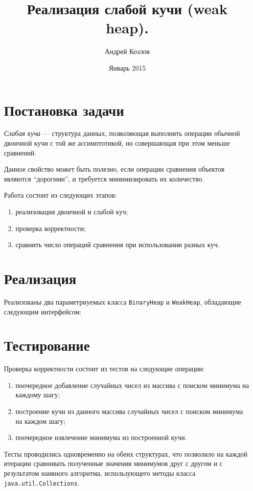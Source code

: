 \documentclass[12pt,a4paper]{article}
\begin{document}
\title{Реализация слабой кучи (weak heap).}
\author{Андрей Козлов}
\date{Январь 2015}

\maketitle

\section*{Постановка задачи}
\textit{Слабая куча} --- структура данных, позволяющая выполнять операции обычной двоичной кучи с той же ассимптотикой, но совершающая при этом меньше сравнений.

Данное свойство может быть полезно, если операции сравнения объектов являются ``дорогими'', и требуется минимизировать их количество.

Работа состоит из следующих этапов:
\begin{enumerate}
	\item реализовация двоичной и слабой куч;
	\item проверка корректности;
	\item сравнить число операций сравнения при использовании разных куч.
\end{enumerate}

\section*{Реализация}
Реализованы два параметриуемых класса \texttt{BinaryHeap} и \texttt{WeakHeap}, обладающие следующим интерфейсом:


\section*{Тестирование}
Проверка корректности состоит из тестов на следующие операции:
\begin{enumerate}
	\item поочередное добавление случайных чисел из массива с поиском минимума на каждому шагу;
	\item построение кучи из данного массива случайных чисел с поиском минимума на каждом шагу;
	\item поочередное извлечение минимума из построенной кучи.
\end{enumerate}

Тесты проводились одновременно на обеих структурах, что позволило на каждой итерации сравнивать полученные значения минимумов друг с другом и с результатом наивного алгоритма, использующего методы класса \texttt{java.util.Collections}.
\end{document}
